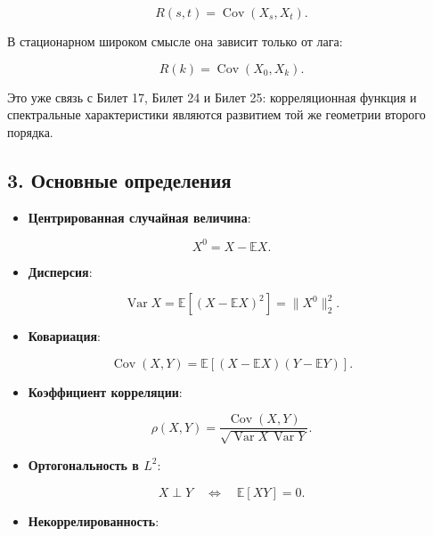 \documentclass[
  11pt,
  a4paper,
]{article}
\providecommand{\tightlist}{%
  \setlength{\itemsep}{0pt}\setlength{\parskip}{0pt}}
\begin{document}
\[
R(s,t)=\operatorname{Cov}(X_s,X_t).
\]

В стационарном широком смысле она зависит только от лага:

\[
R(k)=\operatorname{Cov}(X_0,X_k).
\]

Это уже связь с Билет 17, Билет 24 и Билет 25: корреляционная функция и
спектральные характеристики являются развитием той же геометрии второго
порядка.

\subsection{3. Основные
определения}\label{ux43eux441ux43dux43eux432ux43dux44bux435-ux43eux43fux440ux435ux434ux435ux43bux435ux43dux438ux44f}

\begin{itemize}
\tightlist
\item
  \textbf{Центрированная случайная величина}:
\end{itemize}

\[
X^0=X-\mathbb EX.
\]

\begin{itemize}
\tightlist
\item
  \textbf{Дисперсия}:
\end{itemize}

\[
\operatorname{Var}X=\mathbb E[(X-\mathbb EX)^2]=\|X^0\|_2^2.
\]

\begin{itemize}
\tightlist
\item
  \textbf{Ковариация}:
\end{itemize}

\[
\operatorname{Cov}(X,Y)=\mathbb E[(X-\mathbb EX)(Y-\mathbb EY)].
\]

\begin{itemize}
\tightlist
\item
  \textbf{Коэффициент корреляции}:
\end{itemize}

\[
\rho(X,Y)
=
\frac{\operatorname{Cov}(X,Y)}
{\sqrt{\operatorname{Var}X\,\operatorname{Var}Y}}.
\]

\begin{itemize}
\tightlist
\item
  \textbf{Ортогональность в \(L^2\)}:
\end{itemize}

\[
X\perp Y
\quad\Longleftrightarrow\quad
\mathbb E[XY]=0.
\]

\begin{itemize}
\tightlist
\item
  \textbf{Некоррелированность}:
\end{itemize}
\end{document}
